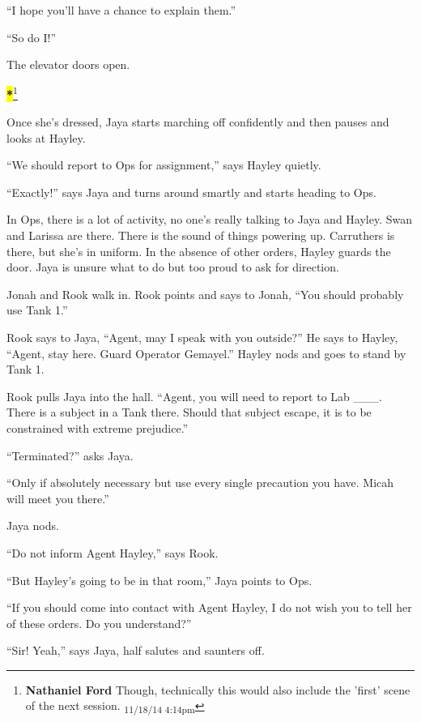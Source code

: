 ``I hope you'll have a chance to explain them.''

``So do I!''

The elevator doors open.




\textbf{\hl{*}}\footnote{\textbf{Nathaniel Ford }Though, technically this would also include the 'first' scene of the next session. \textsubscript{11/18/14 4:14pm}}

Once she's dressed, Jaya starts marching off confidently and then pauses and looks at Hayley.

``We should report to Ops for assignment,'' says Hayley quietly.

``Exactly!'' says Jaya and turns around smartly and starts heading to Ops.



In Ops, there is a lot of activity, no one's really talking to Jaya and Hayley.  Swan and Larissa are there.  There is the sound of things powering up.  Carruthers is there, but she's in uniform.  In the absence of other orders, Hayley guards the door.  Jaya is unsure what to do but too proud to ask for direction.



Jonah and Rook walk in.   Rook points and says to Jonah, ``You should probably use Tank 1.''



Rook says to Jaya, ``Agent, may I speak with you outside?''  He says to Hayley, ``Agent, stay here. Guard Operator Gemayel.''  Hayley nods and goes to stand by Tank 1.



Rook pulls Jaya into the hall. ``Agent, you will need to report to Lab \_\_\_.  There is a subject in a Tank there.  Should that subject escape, it is to be constrained with extreme prejudice.''

``Terminated?'' asks Jaya.

``Only if absolutely necessary but use every single precaution you have.  Micah will meet you there.''

Jaya nods.

``Do not inform Agent Hayley,'' says Rook.

``But Hayley's going to be in that room,'' Jaya points to Ops.

``If you should come into contact with Agent Hayley, I do not wish you to tell her of these orders.  Do you understand?''

``Sir!  Yeah,'' says Jaya, half salutes and saunters off.



